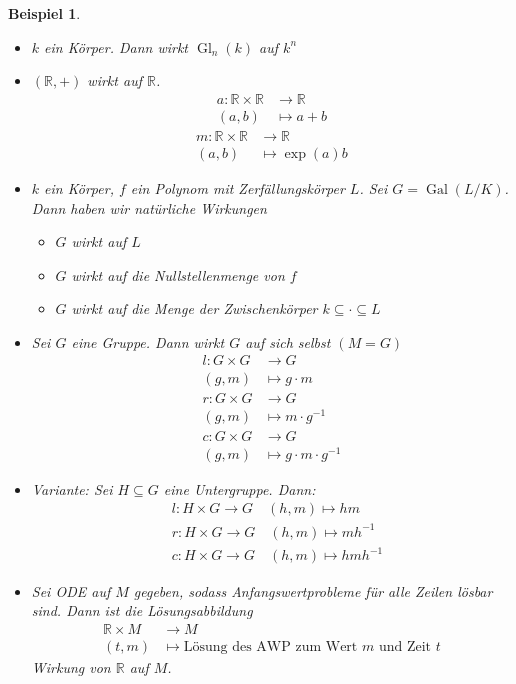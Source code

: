 \documentclass[a4paper,12pt,numbers=noenddot,parskip=full]{scrartcl}
\newcommand{\setR}{\mathbb{R}}
\DeclareMathOperator{\Gal}{Gal}
\theoremstyle{dotless}
\newtheorem{example}[theorem]{Beispiel}
\theoremstyle{remark}
\begin{document}
	\begin{example}
		\begin{itemize}
			\item $k$ ein Körper. Dann wirkt $\operatorname{Gl}_n(k)$ auf $k^n$
			\item $(\setR, +)$ wirkt auf $\setR$.
			\begin{align*}
				a: \setR \times \setR &\longrightarrow \setR \\
				(a,b) &\longmapsto a + b
			\end{align*}
			\begin{align*}
				m: \setR \times \setR &\longrightarrow \setR \\
				(a,b) &\longmapsto \exp(a) b
			\end{align*}
			\item $k$ ein Körper, $f$ ein Polynom mit Zerfällungskörper $L$. Sei $G = \Gal(L/K)$. Dann haben wir natürliche Wirkungen
			\begin{itemize}
				\item $G$ wirkt auf $L$
				\item $G$ wirkt auf die Nullstellenmenge von $f$
				\item $G$ wirkt auf die Menge der Zwischenkörper $k \subseteq \cdot \subseteq L$
			\end{itemize}
			\item Sei $G$ eine Gruppe. Dann wirkt $G$ auf sich selbst $(M = G)$
			\begin{align*}
				l: G \times G &\longrightarrow G \\
				(g,m) &\longmapsto g \cdot m \\
				r: G \times G &\longrightarrow G \\
				(g,m) &\longmapsto m \cdot g^{-1} \\
				c: G \times G &\longrightarrow G \\
				(g,m) &\longmapsto g \cdot m \cdot g^{-1}
			\end{align*}
			\item Variante: Sei $H \subseteq G$ eine Untergruppe. Dann:
			\begin{align*}
				&l: H \times G \to G \quad (h,m) \mapsto h m \\
				&r: H \times G \to G \quad (h,m) \mapsto m h^{-1} \\
				&c: H \times G \to G \quad (h,m) \mapsto h m h^{-1}
			\end{align*}
			\item Sei ODE auf $M$ gegeben, sodass Anfangswertprobleme für alle Zeilen lösbar sind. Dann ist die Lösungsabbildung
			\begin{align*}
				\setR \times M &\longrightarrow M \\
				(t,m) &\longmapsto \text{Lösung des AWP zum Wert $m$ und Zeit $t$}
			\end{align*}
			Wirkung von $\setR$ auf $M$.
		\end{itemize}
	\end{example}
\end{document}

